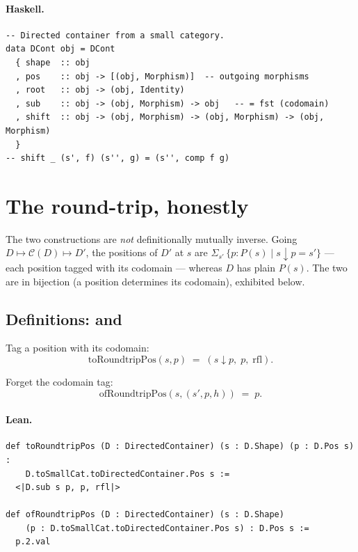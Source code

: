 \documentclass[11pt,a4paper]{article}
\begin{document}
\paragraph{Haskell.}
\begin{lstlisting}[style=haskell]
-- Directed container from a small category.
data DCont obj = DCont
  { shape  :: obj
  , pos    :: obj -> [(obj, Morphism)]  -- outgoing morphisms
  , root   :: obj -> (obj, Identity)
  , sub    :: obj -> (obj, Morphism) -> obj   -- = fst (codomain)
  , shift  :: obj -> (obj, Morphism) -> (obj, Morphism) -> (obj, Morphism)
  }
-- shift _ (s', f) (s'', g) = (s'', comp f g)
\end{lstlisting}


\section{The round-trip, honestly}

The two constructions are \emph{not} definitionally mutually inverse.  Going
$D \mapsto \mathcal{C}(D) \mapsto D'$, the positions of $D'$ at $s$ are
$\Sigma_{s'}\, \{p : P(s) \mid s \downarrow p = s'\}$ --- each position tagged
with its codomain --- whereas $D$ has plain $P(s)$.  The two are in bijection
(a position determines its codomain), exhibited below.

\subsection{Definitions:  and }

\begin{defn}
Tag a position with its codomain:
\[
  \mathrm{toRoundtripPos}(s, p) \;=\; (s \downarrow p,\; p,\; \mathrm{rfl}).
\]
\end{defn}

\begin{defn}
Forget the codomain tag:
\[
  \mathrm{ofRoundtripPos}(s, (s', p, h)) \;=\; p.
\]
\end{defn}

\paragraph{Lean.}
\begin{lstlisting}[style=lean]
def toRoundtripPos (D : DirectedContainer) (s : D.Shape) (p : D.Pos s) :
    D.toSmallCat.toDirectedContainer.Pos s :=
  <|D.sub s p, p, rfl|>

def ofRoundtripPos (D : DirectedContainer) (s : D.Shape)
    (p : D.toSmallCat.toDirectedContainer.Pos s) : D.Pos s :=
  p.2.val
\end{lstlisting}
\end{document}
